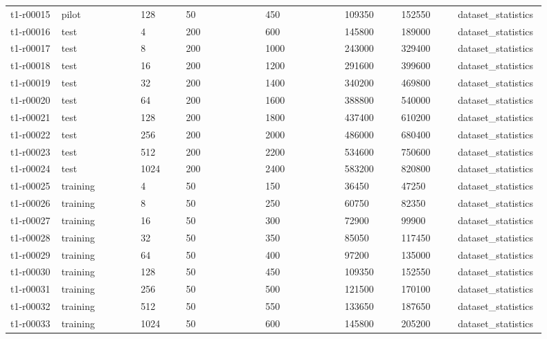 \begin{longtable}{@{}p{0.09\linewidth}p{0.14\linewidth}p{0.08\linewidth}p{0.14\linewidth}p{0.14\linewidth}p{0.1\linewidth}p{0.1\linewidth}p{0.11\linewidth}@{}}
t1-r00015 & pilot & 128 & 50 & 450 & 109350 & 152550 & dataset\_\allowbreak{}statistics \\
t1-r00016 & test & 4 & 200 & 600 & 145800 & 189000 & dataset\_\allowbreak{}statistics \\
t1-r00017 & test & 8 & 200 & 1000 & 243000 & 329400 & dataset\_\allowbreak{}statistics \\
t1-r00018 & test & 16 & 200 & 1200 & 291600 & 399600 & dataset\_\allowbreak{}statistics \\
t1-r00019 & test & 32 & 200 & 1400 & 340200 & 469800 & dataset\_\allowbreak{}statistics \\
t1-r00020 & test & 64 & 200 & 1600 & 388800 & 540000 & dataset\_\allowbreak{}statistics \\
t1-r00021 & test & 128 & 200 & 1800 & 437400 & 610200 & dataset\_\allowbreak{}statistics \\
t1-r00022 & test & 256 & 200 & 2000 & 486000 & 680400 & dataset\_\allowbreak{}statistics \\
t1-r00023 & test & 512 & 200 & 2200 & 534600 & 750600 & dataset\_\allowbreak{}statistics \\
t1-r00024 & test & 1024 & 200 & 2400 & 583200 & 820800 & dataset\_\allowbreak{}statistics \\
t1-r00025 & training & 4 & 50 & 150 & 36450 & 47250 & dataset\_\allowbreak{}statistics \\
t1-r00026 & training & 8 & 50 & 250 & 60750 & 82350 & dataset\_\allowbreak{}statistics \\
t1-r00027 & training & 16 & 50 & 300 & 72900 & 99900 & dataset\_\allowbreak{}statistics \\
t1-r00028 & training & 32 & 50 & 350 & 85050 & 117450 & dataset\_\allowbreak{}statistics \\
t1-r00029 & training & 64 & 50 & 400 & 97200 & 135000 & dataset\_\allowbreak{}statistics \\
t1-r00030 & training & 128 & 50 & 450 & 109350 & 152550 & dataset\_\allowbreak{}statistics \\
t1-r00031 & training & 256 & 50 & 500 & 121500 & 170100 & dataset\_\allowbreak{}statistics \\
t1-r00032 & training & 512 & 50 & 550 & 133650 & 187650 & dataset\_\allowbreak{}statistics \\
t1-r00033 & training & 1024 & 50 & 600 & 145800 & 205200 & dataset\_\allowbreak{}statistics \\
\hline
\end{longtable}
\endgroup
